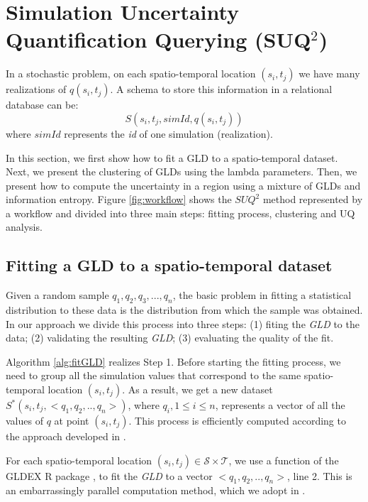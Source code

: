 \documentclass[11pt]{article}
\begin{document}
\section{Simulation Uncertainty Quantification Querying (SUQ$^2$)}
\label{Approach}

In a stochastic problem, on each spatio-temporal location $(s_{i},t_{j})$ we have many realizations of $q(s_{i},t_{j})$. A schema to store this information in a relational database can be:
\begin{equation}\label{eq:data_base_structure}
S(s_{i},t_{j},simId,q(s_{i},t_{j}))
\end{equation}
where $simId$ represents the \textit{id} of one simulation (realization).

In this section, we first show how to fit a GLD to a spatio-temporal dataset. Next, we present the clustering of GLDs using the lambda parameters. Then, we present how to compute the uncertainty in a region using a mixture of GLDs and information entropy.
Figure \ref{fig:workflow} shows the $SUQ^2$ method represented by a workflow and divided into three main steps: fitting process, clustering and UQ analysis.

\subsection{Fitting a GLD to a spatio-temporal dataset}
\label{gldFitProcess}
Given a random sample $q_{1}, q_{2}, q_{3},...,q_{n}$, the basic problem in fitting a statistical distribution to these data is the distribution from which the sample was obtained. In our approach we divide this process into three steps: (1) fiting the \textit{GLD} to the data; (2) validating the resulting \textit{GLD}; (3) evaluating the quality of the fit.

Algorithm \ref{alg:fitGLD} realizes Step 1. Before starting the fitting process, we need to group all the simulation values that correspond to the same spatio-temporal location $(s_{i},t_{j})$.  As a result, we get a new dataset $S^*(s_{i},t_{j},<q_1,q_2,..,q_n>)$, where $q_i, 1 \le i \le n$, represents a vector of all the values of $q$ at point $(s_{i},t_{j})$. This process is efficiently computed according to the approach developed in \cite{Liu2019}.

For each spatio-temporal location $(s_{i},t_{j}) \in \mathcal{S} \times \mathcal{T}$, we use a function of the GLDEX R package \cite{Su2007}, to fit the \textit{GLD} to a vector $<q_1,q_2,..,q_n>$, line 2. This is an embarrassingly parallel computation method, which we adopt in \cite{Liu2019}.
\end{document}
